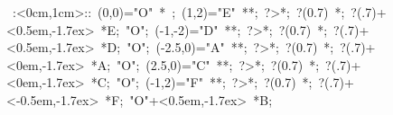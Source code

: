 

%

\hbox{
\xy    <1cm,0cm>:<0cm,1cm>::
       (0,0)="O" *{\bullet}  ; (1,2)="E" **\dir{-}; ?>*\dir{>};
          ?(0.7) *{\bullet};
          ?(.7)+<0.5em,-1.7ex> *{E};
       "O"; (-1,-2)="D" **\dir{-}; ?>*\dir{>}; ?(0.7) *{\bullet};
          ?(.7)+<0.5em,-1.7ex> *{D};
       "O"; (-2.5,0)="A" **\dir{-}; ?>*\dir{>}; ?(0.7) *{\bullet};
          ?(.7)+<0em,-1.7ex> *{A};
       "O"; (2.5,0)="C" **\dir{-}; ?>*\dir{>}; ?(0.7) *{\bullet};
          ?(.7)+<0em,-1.7ex> *{C};
       "O"; (-1,2)="F" **\dir{-}; ?>*\dir{>}; ?(0.7) *{\bullet};
          ?(.7)+<-0.5em,-1.7ex> *{F};
       "O"+<0.5em,-1.7ex> *{B};
       \endxy}


